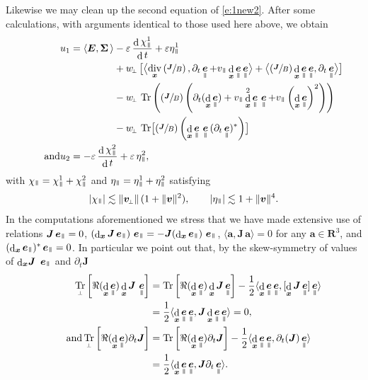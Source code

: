 \documentclass[10pt]{amsart}
\newcommand{\sperp}{{\scriptscriptstyle\perp}}
\newcommand{\blangle}{\bigl\langle}
\newcommand{\brangle}{\bigr\rangle}
\newcommand{\Psfrac}[2]{(\sfrac{#1}{#2})}
\let\eps\varepsilon
\let\d\partial
\DeclareMathOperator\dD{d}\let\dd\dD
\DeclareMathOperator{\Tr}{Tr}
\DeclareMathOperator{\Div}{div}
\theoremstyle{plain}
\theoremstyle{definition}
\newcommand{\be}{\begin{equation}}
\newcommand{\ee}{\end{equation}}
\newcommand\R{\mathbf R}
\newcommand\bE{{\boldsymbol E}}
\newcommand\bJ{{\boldsymbol J}}
\newcommand\bfa{{\boldsymbol a}}
\newcommand\bfv{{\boldsymbol v}}
\newcommand\bfx{{\boldsymbol x}}
\newcommand\Sig{{\boldsymbol \Sigma}}
\DeclareMathOperator{\beD}{\boldsymbol{e}}
\newcommand\eDpar{\beD_\mypar}
\newcommand\vpar{v_\mypar}
\newcommand\bvperp{\bfv_{\!\sperp}}
\newcommand\eperp{w_{\!\sperp}}
\newcommand{\Trperp}[1]{\Tr_\sperp^{#1}}
\newcommand{\mypar}{{\mkern3mu\vphantom{\perp}\vrule depth 0pt\mkern2mu\vrule depth 0pt\mkern3mu}}
\begin{document}
Likewise we may clean up the second equation of \eqref{e:1new2}. After some calculations, with arguments identical to those used here above, we obtain
\begin{align*}
u_1 &= \langle\bE,\Sig\,\rangle-\eps\,\frac{\dD\chi_\mypar^1}{\dD t}+\eps\eta_\mypar^1\\
&\hphantom{{}= \langle\bE,\Sig\,\rangle}
+ \eperp \,\bigl[ \blangle\Div_\bfx\left(\sfrac{\bJ}{B}\right),
\d_t\eDpar+\vpar\dD_\bfx\eDpar\eDpar\brangle +\blangle\Psfrac{\bJ}{B}\dD_\bfx\eDpar\eDpar,\d_t\eDpar\brangle \bigr]
\\
&\hphantom{{}= \langle\bE,\Sig\,\rangle}
-\eperp\,\Tr\left(\Psfrac{\bJ}{B}\left(\d_t(\dD_\bfx\eDpar)+\vpar\dD_{\bfx}^2\eDpar\,\eDpar+\vpar\left(\dD_{\bfx}\eDpar\right)^2\right)\right)\\
&\hphantom{{}= \langle\bE,\Sig\,\rangle}
- \eperp\,\Tr\bigl[\Psfrac{\bJ}{B}\left(\dD_\bfx\eDpar\,\eDpar\,(\d_t\eDpar)^*\right)\bigr]\\
\tag*{and}
u_2 &=-\eps\,\frac{\dD\chi^2_\mypar}{\dD t}+\eps\,\eta^2_\mypar,
\end{align*}
with $\chi_\mypar = \chi_\mypar^1+\chi_\mypar^2$ and $\eta_\mypar=\eta_\mypar^1+\eta_\mypar^2$ satisfying
\be\label{par-remainders}
|\chi_\mypar|\lesssim \|\bvperp\|\,(1+\|\bfv\|^2),\qquad
|\eta_\mypar|\lesssim 1+\|\bfv\|^4.
\ee
In the computations aforementioned we stress that we have made extensive use of relations $\bJ\eDpar=0$, $\left(\dD_\bfx\bJ\eDpar\right)\,\eDpar=-\bJ (\dD_\bfx\eDpar)\,
\eDpar$, $\langle \bfa, \bJ\,\bfa\rangle=0$ for
any $\bfa\in\R^3$, and $(\dD_\bfx\eDpar)^*\eDpar=0$. In particular we point out that, by the skew-symmetry of values of $\dD_{\bfx}\!\bJ\ \eDpar$ and $\d_t\bJ$
\begin{align*}
\Trperp{}\left[\Re(\dD_{\bfx}\eDpar)\dD_{\bfx}\bJ\,\eDpar\right]
&=\Tr\left[\Re(\dD_{\bfx}\eDpar)\dD_{\bfx}\bJ\eDpar\right]
-\frac12\langle\dD_{\bfx}\eDpar\eDpar,[\dD_{\bfx}\bJ\eDpar]\eDpar\rangle
\\
&=\frac12\langle\dD_{\bfx}\eDpar\eDpar,\bJ\dD_{\bfx}\eDpar\eDpar\rangle
=0,\\
\tag*{and}
\Trperp{}\left[\Re(\dD_{\bfx}\eDpar)\d_t\bJ\right]
&=\Tr\left[\Re(\dD_{\bfx}\eDpar)\d_t\bJ\right]
-\frac12\langle\dD_{\bfx}\eDpar\eDpar,\d_t(\bJ)\eDpar\rangle\\
&=\frac12\langle\dD_{\bfx}\eDpar\eDpar,\bJ\d_t\eDpar\rangle.
\end{align*}
\end{document}
